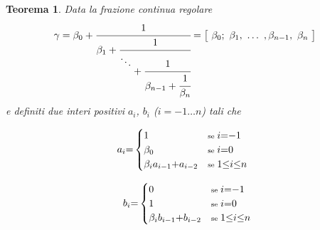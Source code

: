 \documentclass[twoside,symmetric,justified,openany,nobib]{tufte-book}
\newtheorem{thm}{Teorema}
\begin{document}
\begin{thm}
  \label{convergenti}
  Data la frazione continua regolare
  \begin{equation*}
    \gamma =
    \beta_0+\cfrac{1}{\beta_1+\cfrac{1}{\raisebox{0.5\height}{$\ddots$}+\cfrac{1}{\beta_{n-1}+\cfrac{1}{\beta_n}}}} = \bigl[\ \beta_0;\ \beta_1,\ \dots\ ,\beta_{n-1},\ \beta_n\ \bigr]
  \end{equation*}
  e definiti due interi positivi $a_i$, $b_i$ ($i{=}{-}1{\dots}n$) tali che
  
  \begin{minipage}[b]{0.45\linewidth}
    \center
    \[
      \hspace{-5pt}a_i {=}
      \begin{cases}
        1 &\text{\scriptsize se } i{=}{-}1\\
        \beta_0 &\text{\scriptsize se } i{=}0\\
        \beta_i a_{i-1}{+}a_{i-2} &\text{\scriptsize se } 1{\leq}i{\leq}n
      \end{cases}
    \]
  \end{minipage}
  \begin{minipage}[b]{0.45\linewidth}
    \center
    \[
      \hspace{5pt}b_i {=}
      \begin{cases}
        0 &\text{\scriptsize se } i{=}{-}1\\
        1 &\text{\scriptsize se } i{=}0\\
        \beta_i b_{i-1}{+}b_{i-2} &\text{\scriptsize se } 1{\leq}i{\leq}n
      \end{cases}
    \]
  \end{minipage}


\end{thm}
\end{document}
